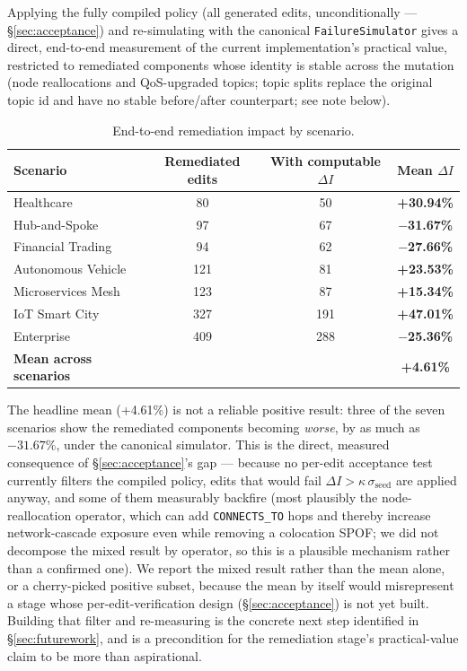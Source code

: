 \documentclass[review]{elsarticle}
\begin{document}
Applying the fully compiled policy (all generated edits, unconditionally --- \S\ref{sec:acceptance})
and re-simulating with the canonical \texttt{FailureSimulator} gives a direct, end-to-end
measurement of the current implementation's practical value, restricted to remediated components
whose identity is stable across the mutation (node reallocations and QoS-upgraded topics; topic
splits replace the original topic id and have no stable before/after counterpart; see note below).

\begin{table}[h]
\centering
\caption{End-to-end remediation impact by scenario.}
\label{tab:remediation}
\begin{tabular}{@{}lccc@{}}
\toprule
Scenario & Remediated edits & With computable $\Delta I$ & Mean $\Delta I$ \\
\midrule
Healthcare & 80 & 50 & \textbf{+30.94\%} \\
Hub-and-Spoke & 97 & 67 & \textbf{$-$31.67\%} \\
Financial Trading & 94 & 62 & \textbf{$-$27.66\%} \\
Autonomous Vehicle & 121 & 81 & \textbf{+23.53\%} \\
Microservices Mesh & 123 & 87 & \textbf{+15.34\%} \\
IoT Smart City & 327 & 191 & \textbf{+47.01\%} \\
Enterprise & 409 & 288 & \textbf{$-$25.36\%} \\
\midrule
\textbf{Mean across scenarios} & & & \textbf{+4.61\%} \\
\bottomrule
\end{tabular}
\end{table}

The headline mean (+4.61\%) is not a reliable positive result: three of the seven scenarios show the
remediated components becoming \emph{worse}, by as much as $-31.67\%$, under the canonical
simulator. This is the direct, measured consequence of \S\ref{sec:acceptance}'s gap --- because no
per-edit acceptance test currently filters the compiled policy, edits that would fail $\Delta I >
\kappa\,\sigma_{\text{seed}}$ are applied anyway, and some of them measurably backfire (most
plausibly the node-reallocation operator, which can add \texttt{CONNECTS\_TO} hops and thereby
increase network-cascade exposure even while removing a colocation SPOF; we did not decompose the
mixed result by operator, so this is a plausible mechanism rather than a confirmed one). We report
the mixed result rather than the mean alone, or a cherry-picked positive subset, because the mean by
itself would misrepresent a stage whose per-edit-verification design (\S\ref{sec:acceptance}) is not
yet built. Building that filter and re-measuring is the concrete next step identified in
\S\ref{sec:futurework}, and is a precondition for the remediation stage's practical-value claim to be
more than aspirational.
\end{document}
